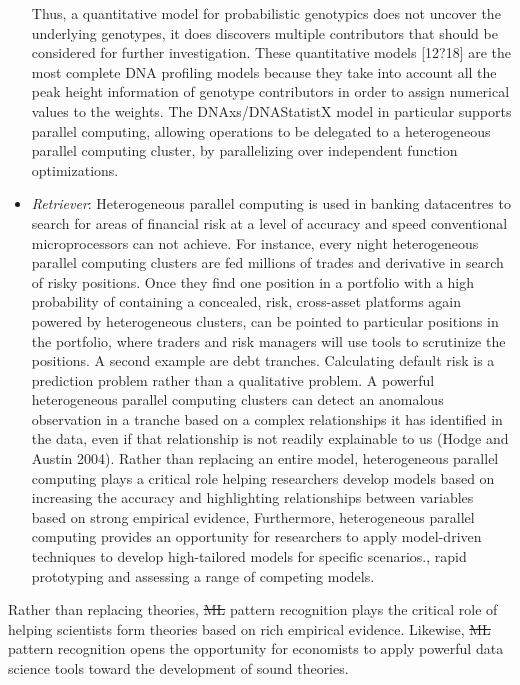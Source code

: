 \documentclass[10pt]{article}[draft]
\begin{document}
\begin{itemize}
Thus, a quantitative model for probabilistic genotypics does not uncover the underlying genotypes, it does discovers multiple contributors that should be considered for further investigation.
 These {quantitative} models [12?18] are the most complete DNA profiling models because they take into account all  the peak height information of genotype contributors in order to assign numerical values to the weights. The DNAxs/DNAStatistX model in particular supports parallel computing, allowing operations to be delegated to a heterogeneous parallel computing cluster, by parallelizing over independent function optimizations. 
	\item \emph{Retriever}: Heterogeneous parallel computing  is used in banking datacentres to search for areas of financial risk at a level of accuracy and speed conventional microprocessors can not achieve. For instance, every night heterogeneous parallel computing clusters are fed millions of trades and derivative  in search of risky positions. Once they find one position in a portfolio with a high probability of containing a concealed, risk, cross-asset platforms  again powered by heterogeneous clusters, can be pointed to particular positions in the portfolio, where traders  and risk managers will use tools to scrutinize the positions. A second example are debt tranches. Calculating default risk is a prediction problem rather than a qualitative problem. A powerful heterogeneous parallel computing clusters can detect an anomalous observation in a tranche based on a complex relationships it has identified in the data, even if that relationship is not readily explainable to us (Hodge and Austin 2004).
	Rather than replacing an entire model, heterogeneous parallel computing plays a critical role helping researchers develop models based on increasing the accuracy and highlighting relationships between variables based on strong empirical evidence, Furthermore, heterogeneous parallel computing provides an opportunity for researchers to apply model-driven techniques to develop high-tailored models for specific scenarios., rapid prototyping and assessing a range of competing models. 
\end{itemize}

Rather than replacing theories, \st{ML} pattern recognition plays the critical role of helping scientists form theories based on rich empirical evidence. Likewise, \st{ML} pattern recognition opens the opportunity for economists to apply powerful data science tools toward the development of sound theories.
	
\end{document}

